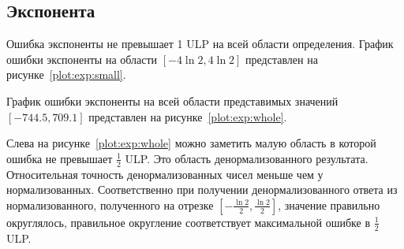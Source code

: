 
\subsection{Экспонента}

Ошибка экспоненты не превышает 1 ULP на всей области определения.
График ошибки экспоненты на области $[-4\ln{2}, 4\ln{2}]$ представлен на рисунке~\ref{plot:exp:small}.

График ошибки экспоненты на всей области представимых значений \newline $[-744.5, 709.1]$ представлен на рисунке~\ref{plot:exp:whole}.

Слева на рисунке~\ref{plot:exp:whole} можно заметить малую область в которой ошибка не превышает $\frac{1}{2}$ ULP.
Это область денормализованного результата.
Относительная точность денормализованных чисел меньше чем у нормализованных.
Соответственно при получении денормализованного ответа из нормализованного, полученного на отрезке $[-\frac{\ln{2}}{2}, \frac{\ln{2}}{2}]$, значение правильно округлялось, правильное округление соответствует максимальной ошибке в $\frac{1}{2}$ ULP.

